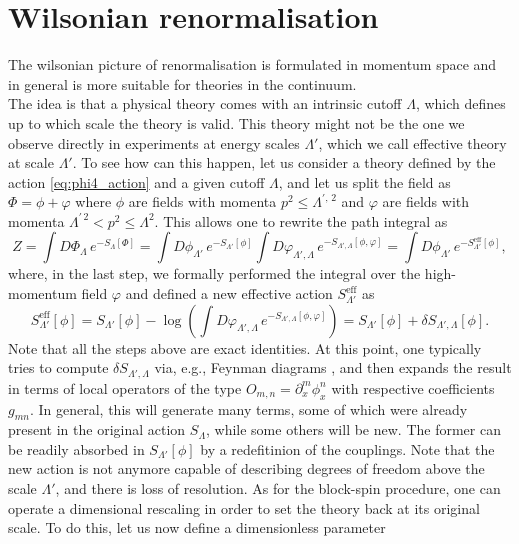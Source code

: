 \section{Wilsonian renormalisation}
\label{sec:wilson_rg}
The wilsonian picture of renormalisation \cite{WilsonRG1,WilsonRG2} is formulated in momentum space and in general is more suitable for theories in the continuum.\\
The idea is that a physical theory comes with an intrinsic cutoff $\Lambda$, which defines up to which scale the theory is valid. This theory might not be the one
we observe directly in experiments at energy scales $\Lambda'$, which we call effective theory at scale $\Lambda'$. To see how can this happen, let us consider a theory defined by the action \eqref{eq:phi4_action} and a given cutoff $\Lambda$, and let us split the field as $\Phi = \phi + \varphi$ where $\phi$ are fields with momenta $p^2 \leq \Lambda^{\prime, \, 2}$ and $\varphi$ are fields with momenta $\Lambda^{\prime \, 2} < p^2 \leq \Lambda^2$. This allows one to rewrite the path integral as
\begin{equation*}
    Z = \int D\Phi_\Lambda \, e^{-S_\Lambda[\Phi]} = \int D\phi_{\Lambda'} \, e^{-S_{\Lambda'}[\phi]} \int D\varphi_{\Lambda', \Lambda}  \, e^{-S_{\Lambda', \Lambda}[\phi, \varphi]} = \int D\phi_{\Lambda'} \, e^{-S_{\Lambda'}^\text{eff}[\phi]},
\end{equation*}
where, in the last step, we formally performed the integral over the high-momentum field $\varphi$ and defined a new effective action $S^\text{eff}_{\Lambda'}$ as
\begin{equation*}
    S_{\Lambda'}^\text{eff}[\phi] = S_{\Lambda'}[\phi] - \log\left( \int D\varphi_{\Lambda', \Lambda}  \, e^{-S_{\Lambda', \Lambda}[\phi, \varphi]}\right) =  S_{\Lambda'}[\phi] + \delta S_{\Lambda', \Lambda}[\phi].
\end{equation*}
Note that all the steps above are exact identities. At this point, one typically tries to compute $\delta S_{\Lambda', \Lambda}$ via, e.g., Feynman diagrams \cite{Peskin:1995ev}, and then expands the result in terms of local operators of the type $O_{m,n} = \partial^m_x\phi^n_x$ with respective coefficients $g_{mn}$. In general, this will generate many terms, some of which were already present in the original action $S_\Lambda$, while some others will be new. The former can be readily absorbed in $S_{\Lambda'}[\phi]$ by a redefitinion of the couplings. 
Note that the new action is not anymore capable of describing degrees of freedom above the scale $\Lambda'$, and there is loss of resolution. As for the block-spin procedure, one can operate a dimensional rescaling in order to set the theory back at its original scale. To do this, let us now define a dimensionless parameter 
